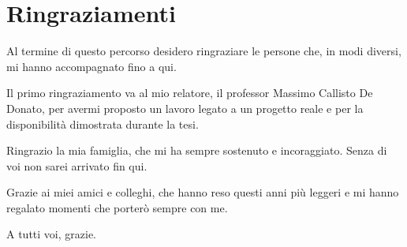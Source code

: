 \chapter*{Ringraziamenti}
\label{chap:Ringraziamenti}

Al termine di questo percorso desidero ringraziare le persone che, in modi diversi, mi hanno accompagnato fino a qui.

Il primo ringraziamento va al mio relatore, il professor Massimo Callisto De Donato, per avermi proposto un lavoro legato a un progetto reale e per la disponibilità dimostrata durante la tesi.

Ringrazio la mia famiglia, che mi ha sempre sostenuto e incoraggiato. Senza di voi non sarei arrivato fin qui.

Grazie ai miei amici e colleghi, che hanno reso questi anni più leggeri e mi hanno regalato momenti che porterò sempre con me.

A tutti voi, grazie.

